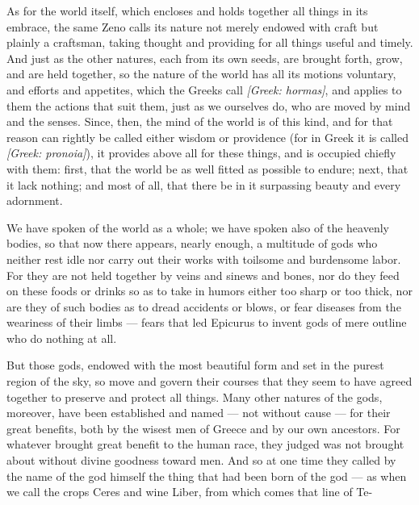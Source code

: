  As for the world itself, which encloses and holds together all things in its embrace, the same Zeno calls its nature not merely endowed with craft but plainly a craftsman, taking thought and providing for all things useful and timely. And just as the other natures, each from its own seeds, are brought forth, grow, and are held together, so the nature of the world has all its motions voluntary, and efforts and appetites, which the Greeks call \textit{[Greek: hormas]}, and applies to them the actions that suit them, just as we ourselves do, who are moved by mind and the senses. Since, then, the mind of the world is of this kind, and for that reason can rightly be called either wisdom or providence (for in Greek it is called \textit{[Greek: pronoia]}), it provides above all for these things, and is occupied chiefly with them: first, that the world be as well fitted as possible to endure; next, that it lack nothing; and most of all, that there be in it surpassing beauty and every adornment.

 We have spoken of the world as a whole; we have spoken also of the heavenly bodies, so that now there appears, nearly enough, a multitude of gods who neither rest idle nor carry out their works with toilsome and burdensome labor. For they are not held together by veins and sinews and bones, nor do they feed on these foods or drinks so as to take in humors either too sharp or too thick, nor are they of such bodies as to dread accidents or blows, or fear diseases from the weariness of their limbs — fears that led Epicurus to invent gods of mere outline who do nothing at all.

 But those gods, endowed with the most beautiful form and set in the purest region of the sky, so move and govern their courses that they seem to have agreed together to preserve and protect all things. Many other natures of the gods, moreover, have been established and named — not without cause — for their great benefits, both by the wisest men of Greece and by our own ancestors. For whatever brought great benefit to the human race, they judged was not brought about without divine goodness toward men. And so at one time they called by the name of the god himself the thing that had been born of the god — as when we call the crops Ceres and wine Liber, from which comes that line of Te-

